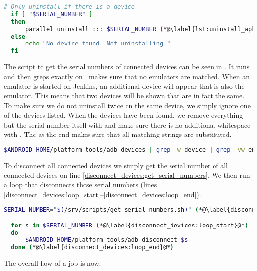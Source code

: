 \begin{description}
\begin{lstlisting}[language=bash,caption=Script that uninstalls all installed Giraf apps on all devices,label=lst:uninstall_apks]
  # Only uninstall if there is a device
  if [ "$SERIAL_NUMBER" ]
  then
      parallel uninstall ::: $SERIAL_NUMBER (*@\label{lst:uninstall_apks:parallel_loop}@*)
  else
      echo "No device found. Not uninstalling."
  fi
  \end{lstlisting}

  The script to get the serial numbers of connected devices can be seen in . It runs  and then {grep}s exactly on .  makes sure that no emulators are matched. When an emulator is started on Jenkins, an additional device will appear that is also the emulator. This means that two devices will be shown that are in fact the same. To make sure we do not uninstall twice on the same device, we simply ignore one of the devices listed. When the devices have been found, we remove everything but the serial number itself with  and make sure there is no additional whitespace with . The  at the end makes sure that all matching strings are substituted.

  \begin{lstlisting}[language=bash,caption=Script that gets the serial numbers of all connected devices,label=lst:get_serial_numbers]
  $ANDROID_HOME/platform-tools/adb devices | grep -w device | grep -vw emulator | sed 's/\s*device//' | sed 's/\s*//g'
  \end{lstlisting}
  \item[Disconnection Script] To disconnect all connected devices we simply get the serial number of all connected devices on line \ref{disconnect_devices:get_serial_numbers}. We then run a loop that disconnects those serial numbers (lines \ref{disconnect_devices:loop_start}--\ref{disconnect_devices:loop_end}).
  \begin{lstlisting}[language=bash,caption=Script that disconnects all connected devices,label=lst:disconnect_devices]
  SERIAL_NUMBER="$(/srv/scripts/get_serial_numbers.sh)" (*@\label{disconnect_devices:get_serial_numbers}@*)

  for s in $SERIAL_NUMBER (*@\label{disconnect_devices:loop_start}@*)
  do
      $ANDROID_HOME/platform-tools/adb disconnect $s
  done (*@\label{disconnect_devices:loop_end}@*)
  \end{lstlisting}
\end{description}

The overall flow of a job is now:

